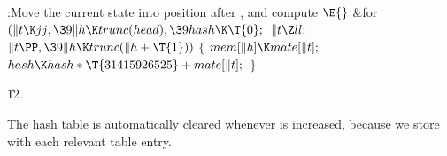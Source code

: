 \B{}:Move the current state into
position after , and compute \X${}\E{}$\6
\&{for} ${}(\|t\K\\{jj},\39\|h\K\\{trunc}(\\{head}),\39\\{hash}\K\T{0};{}$ ${}%
\|t\Z\\{ll};{}$ ${}\|t\PP,\39\|h\K\\{trunc}(\|h+\T{1})){}$\5
${}\{{}$\1\6
${}\\{mem}[\|h]\K\\{mate}[\|t];{}$\6
${}\\{hash}\K\\{hash}*\T{31415926525}+\\{mate}[\|t];{}$\6
\4${}\}{}$\2\par
\U12.\fi

The hash table is automatically cleared
whenever  is increased,
because we store  with each relevant table entry.

